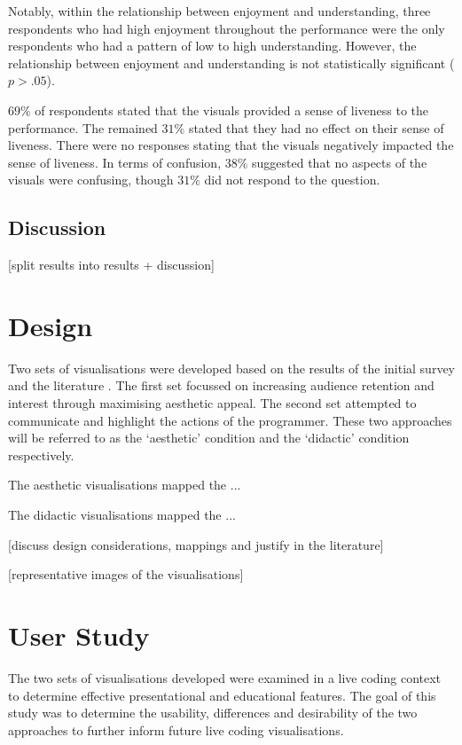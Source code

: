 \documentclass{sig-alternate}
\begin{document}
Notably, within the relationship between enjoyment and understanding, three respondents who had high enjoyment throughout the performance were the only respondents who had a pattern of low to high understanding. However, the relationship between enjoyment and understanding is not statistically significant ($p > .05$).

$69\%$ of respondents stated that the visuals provided a sense of liveness to the performance. The remained $31\%$ stated that they had no effect on their sense of liveness. There were no responses stating that the visuals negatively impacted the sense of liveness.
In terms of confusion, $38\%$ suggested that no aspects of the visuals were confusing, though $31\%$ did not respond to the question.

\subsection{Discussion}

{\color{red}[split results into results + discussion]}

\section{Design}

Two sets of visualisations were developed based on the results of the initial survey and the literature . The first set focussed on increasing audience retention and interest through maximising aesthetic appeal. The second set attempted to communicate and highlight the actions of the programmer. These two approaches will be referred to as the `aesthetic' condition and the `didactic' condition respectively.

The aesthetic visualisations mapped the ...

The didactic visualisations mapped the ...

{\color{red}[discuss design considerations, mappings and justify in the literature]}

{\color{red}[representative images of the visualisations]}

\section{User Study}

The two sets of visualisations developed were examined in a live coding context to determine effective presentational and educational features. The goal of this study was to determine the usability, differences and desirability of the two approaches to further inform future live coding visualisations.
\end{document}

